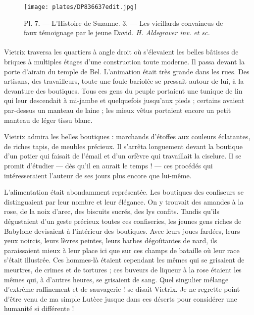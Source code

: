 \documentclass[a4paper, 11pt, oneside, polutonikogreek, french]{article}
\begin{document}
\bigskip
\centerline{\EightStarTaper}
\centerline{\EightStarTaper\EightStarTaper}
\bigskip
\clearpage
\vspace*{\fill}
\begin{figure}[H]
\centering
\texttt{[image: plates/DP836637edit.jpg]}
\caption{Pl. 7. --- L'Histoire de Suzanne. 3. --- Les vieillards convaincus de faux témoignage par le jeune David. \emph{H. Aldegraver inv. et sc.}}
\end{figure}
\vspace*{\fill}
\clearpage
\paragraph{}
Vietrix traversa les quartiers à angle droit où s'élevaient les belles bâtisses de briques à multiples étages d'une construction toute moderne. Il passa devant la porte d'airain du temple de Bel. L'animation était très grande dans les rues. Des artisans, des travailleurs, toute une foule bariolée se pressait autour de lui, à la devanture des boutiques. Tous ces gens du peuple portaient une tunique de lin qui leur descendait à mi-jambe et quelquefois jusqu'aux pieds ; certains avaient par-dessus un manteau de laine ; les mieux vêtus portaient encore un petit manteau de léger tissu blanc.

Vietrix admira les belles boutiques : marchands d'étoffes aux couleurs éclatantes, de riches tapis, de meubles précieux. Il s'arrêta longuement devant la boutique d'un potier qui faisait de l'émail et d'un orfèvre qui travaillait la ciselure. Il se promit d'étudier --- dès qu'il en aurait le temps ! --- ces procédés qui intéresseraient l'auteur de ses jours plus encore que lui-même.

L'alimentation était abondamment représentée. Les boutiques des confiseurs se distinguaient par leur nombre et leur élégance. On y trouvait des amandes à la rose, de la noix d'arec, des biscuits sucrés, des lys confits. Tandis qu'ils dégustaient d'un geste précieux toutes ces confiseries, les jeunes gens riches de Babylone devisaient à l'intérieur des boutiques. Avec leurs joues fardées, leurs yeux noircis, leurs lèvres peintes, leurs barbes dégoûtantes de nard, ils paraissaient mieux à leur place ici que sur ces champs de bataille où leur race s'était illustrée. Ces hommes-là étaient cependant les mêmes qui se grisaient de meurtres, de crimes et de tortures ; ces buveurs de liqueur à la rose étaient les mêmes qui, à d'autres heures, se grisaient de sang. Quel singulier mélange d'extrême raffinement et de sauvagerie ! se disait Vietrix. Je ne regrette point d'être venu de ma simple Lutèce jusque dans ces déserts pour considérer une humanité si différente !
\end{document}
